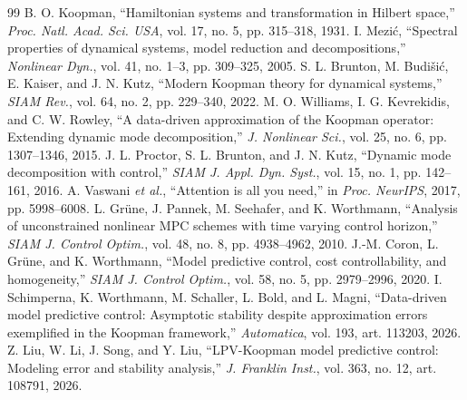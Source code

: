 \documentclass[journal]{IEEEtran}
\theoremstyle{plain}
\theoremstyle{definition}
\theoremstyle{definition}
\begin{document}
\begin{thebibliography}{99}
B. O. Koopman, ``Hamiltonian systems and transformation in Hilbert space,'' \emph{Proc. Natl. Acad. Sci. USA}, vol. 17, no. 5, pp. 315--318, 1931.
I. Mezi\'c, ``Spectral properties of dynamical systems, model reduction and decompositions,'' \emph{Nonlinear Dyn.}, vol. 41, no. 1--3, pp. 309--325, 2005.
S. L. Brunton, M. Budi\v{s}i\'c, E. Kaiser, and J. N. Kutz, ``Modern Koopman theory for dynamical systems,'' \emph{SIAM Rev.}, vol. 64, no. 2, pp. 229--340, 2022.
M. O. Williams, I. G. Kevrekidis, and C. W. Rowley, ``A data-driven approximation of the Koopman operator: Extending dynamic mode decomposition,'' \emph{J. Nonlinear Sci.}, vol. 25, no. 6, pp. 1307--1346, 2015.
J. L. Proctor, S. L. Brunton, and J. N. Kutz, ``Dynamic mode decomposition with control,'' \emph{SIAM J. Appl. Dyn. Syst.}, vol. 15, no. 1, pp. 142--161, 2016.
A. Vaswani \emph{et al.}, ``Attention is all you need,'' in \emph{Proc. NeurIPS}, 2017, pp. 5998--6008.
L. Gr{\"u}ne, J. Pannek, M. Seehafer, and K. Worthmann, ``Analysis of unconstrained nonlinear MPC schemes with time varying control horizon,'' \emph{SIAM J. Control Optim.}, vol. 48, no. 8, pp. 4938--4962, 2010.
J.-M. Coron, L. Gr{\"u}ne, and K. Worthmann, ``Model predictive control, cost controllability, and homogeneity,'' \emph{SIAM J. Control Optim.}, vol. 58, no. 5, pp. 2979--2996, 2020.
I. Schimperna, K. Worthmann, M. Schaller, L. Bold, and L. Magni, ``Data-driven model predictive control: Asymptotic stability despite approximation errors exemplified in the Koopman framework,'' \emph{Automatica}, vol. 193, art. 113203, 2026.
Z. Liu, W. Li, J. Song, and Y. Liu, ``LPV-Koopman model predictive control: Modeling error and stability analysis,'' \emph{J. Franklin Inst.}, vol. 363, no. 12, art. 108791, 2026.
\end{thebibliography}
\end{document}
